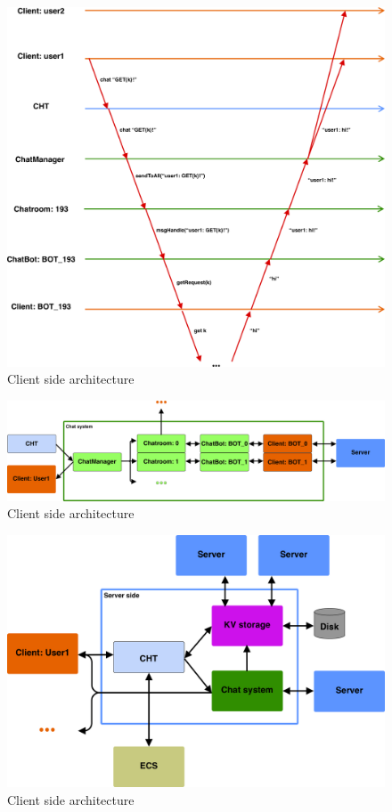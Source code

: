 \begin{figure}[h]
	\centering
	\includegraphics[width=\linewidth]{figures/chat/chat_graph.png}
	\caption{Client side architecture}
\end{figure}

\begin{figure}[h]
	\centering
	\includegraphics[width=\linewidth]{figures/chat/chat_arch.png}
	\caption{Client side architecture}
\end{figure}

\begin{figure}[h]
	\centering
	\includegraphics[width=\linewidth]{figures/chat/chat_full_arch.png}
	\caption{Client side architecture}
\end{figure}

